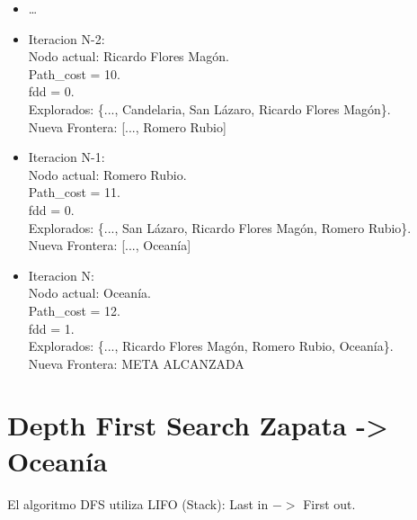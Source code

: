\documentclass[10pt,a4paper]{article}
\begin{document}
\begin{itemize}
    \item \dots
    

    \item Iteracion N-2:\\
    Nodo actual: Ricardo Flores Magón.\\
    Path\_cost = 10.\\
    fdd = 0.\\
    Explorados: \{..., Candelaria, San Lázaro, Ricardo Flores Magón\}.\\
    Nueva Frontera: [..., Romero Rubio]

    \item Iteracion N-1:\\
    Nodo actual: Romero Rubio.\\
    Path\_cost = 11.\\
    fdd = 0.\\
    Explorados: \{..., San Lázaro, Ricardo Flores Magón, Romero Rubio\}.\\
    Nueva Frontera: [..., Oceanía]

    \item Iteracion N:\\
    Nodo actual: Oceanía.\\
    Path\_cost = 12.\\
    fdd = 1.\\
    Explorados: \{..., Ricardo Flores Magón, Romero Rubio, Oceanía\}.\\
    Nueva Frontera: META ALCANZADA

\end{itemize}


\newpage


\section{Depth First Search Zapata -> Oceanía}

\vspace{3mm}

El algoritmo DFS utiliza LIFO (Stack): Last in \(->\) First out.
\end{document}
